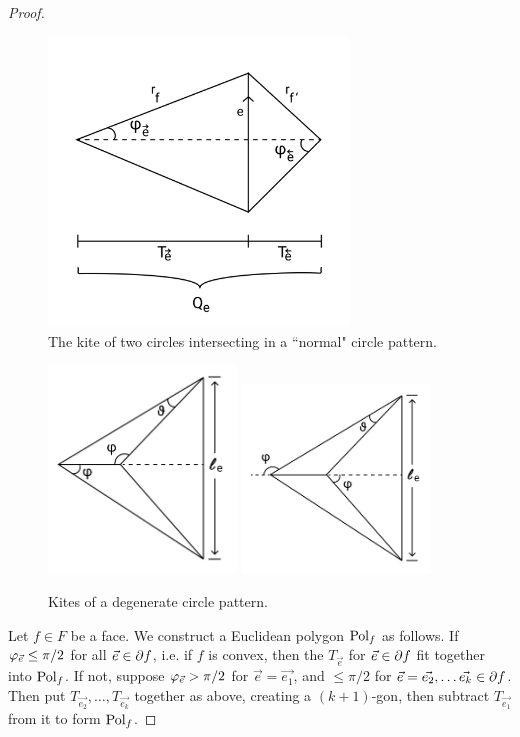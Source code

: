 \begin{proof}
\begin{figure}
\includegraphics[width=8cm]{more_pictures/kite.png}
	\caption{The kite of two circles intersecting in a ``normal" circle pattern.}
\end{figure}
\begin{figure}
\includegraphics[width=5cm]{more_pictures/positive_angle.png}
\includegraphics[width=5cm]{more_pictures/negative_angle.png}
	\caption{Kites of a degenerate circle pattern.}
\end{figure}


Let $f \in F$ be a face.
We construct a Euclidean polygon ${\text{Pol}}_f$ as follows.
If $\varphi_{\vec{e}} \leq \pi/2$ for all $\vec{e} \in \partial f$,
i.e. if $f$ is convex, then 
the $T_{\vec{e}}$ for $\vec{e}\in \partial f$
fit together into ${\text{Pol}}_f$.
If not, suppose $\varphi_{\vec{e}} > \pi/2$
for $\vec{e} = \vec{e_1}$, 
and $\leq \pi/2$ for $\vec{e} = \vec{e_2},\ldots \vec{e_k} \in \partial f$.
Then put $T_{\vec{e_2}},\ldots,T_{\vec{e_k}}$ together as above,
creating a $(k+1)$-gon,
then subtract $T_{\vec{e_1}}$ from it to form ${\text{Pol}}_f$.


\end{proof}
